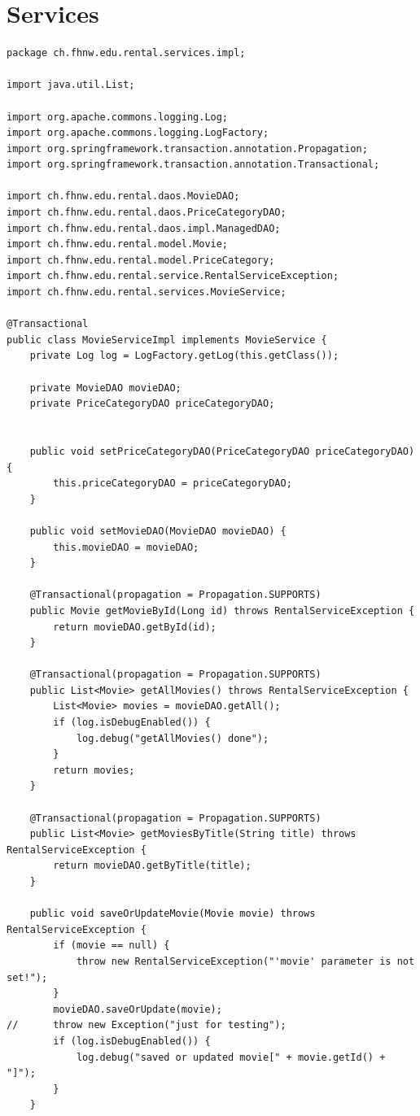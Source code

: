 \documentclass[a4paper,10pt]{scrreprt}
\begin{document}
\section{Services}
\begin{lstlisting}[caption=MovieService]
 package ch.fhnw.edu.rental.services.impl;

import java.util.List;

import org.apache.commons.logging.Log;
import org.apache.commons.logging.LogFactory;
import org.springframework.transaction.annotation.Propagation;
import org.springframework.transaction.annotation.Transactional;

import ch.fhnw.edu.rental.daos.MovieDAO;
import ch.fhnw.edu.rental.daos.PriceCategoryDAO;
import ch.fhnw.edu.rental.daos.impl.ManagedDAO;
import ch.fhnw.edu.rental.model.Movie;
import ch.fhnw.edu.rental.model.PriceCategory;
import ch.fhnw.edu.rental.service.RentalServiceException;
import ch.fhnw.edu.rental.services.MovieService;

@Transactional
public class MovieServiceImpl implements MovieService {
	private Log log = LogFactory.getLog(this.getClass());
	
	private MovieDAO movieDAO;
	private PriceCategoryDAO priceCategoryDAO;


	public void setPriceCategoryDAO(PriceCategoryDAO priceCategoryDAO) {
		this.priceCategoryDAO = priceCategoryDAO;
	}

	public void setMovieDAO(MovieDAO movieDAO) {
		this.movieDAO = movieDAO;
	}

	@Transactional(propagation = Propagation.SUPPORTS)
	public Movie getMovieById(Long id) throws RentalServiceException {
		return movieDAO.getById(id);
	}

	@Transactional(propagation = Propagation.SUPPORTS)
	public List<Movie> getAllMovies() throws RentalServiceException {
		List<Movie> movies = movieDAO.getAll();
		if (log.isDebugEnabled()) {
			log.debug("getAllMovies() done");
		}
		return movies;
	}

	@Transactional(propagation = Propagation.SUPPORTS)
	public List<Movie> getMoviesByTitle(String title) throws RentalServiceException {
		return movieDAO.getByTitle(title);
	}

	public void saveOrUpdateMovie(Movie movie) throws RentalServiceException {
		if (movie == null) {
			throw new RentalServiceException("'movie' parameter is not set!");
		}
		movieDAO.saveOrUpdate(movie);
//		throw new Exception("just for testing");
		if (log.isDebugEnabled()) {
			log.debug("saved or updated movie[" + movie.getId() + "]");
		}
	}



\end{lstlisting}
\end{document}
